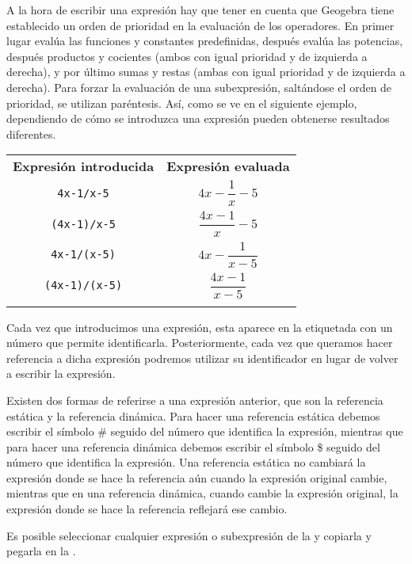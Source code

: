 A la hora de escribir una expresión hay que tener en cuenta que Geogebra tiene establecido un orden de prioridad en la evaluación de los operadores.
En primer lugar evalúa las funciones y constantes predefinidas, después evalúa las potencias, después productos y cocientes (ambos con igual prioridad y de izquierda a derecha), y por último sumas y restas (ambas con igual prioridad y de izquierda a derecha).
Para forzar la evaluación de una subexpresión, saltándose el orden de prioridad, se utilizan paréntesis.
Así, como se ve en el siguiente ejemplo, dependiendo de cómo se introduzca una expresión pueden obtenerse resultados diferentes.


\begin{center}\renewcommand{\arraystretch}{2}
\begin{tabular}{cc}
\tcrule
\textbf{Expresión introducida} & \textbf{Expresión evaluada} \\
\texttt{4x-1/x-5}              & $4x-\dfrac{1}{x}-5$         \\
\texttt{(4x-1)/x-5}            & $\dfrac{4x-1}{x}-5$         \\
\texttt{4x-1/(x-5)}            & $4x-\dfrac{1}{x-5}$         \\
\texttt{(4x-1)/(x-5)}          & $\dfrac{4x-1}{x-5}$         \\
\bcrule
\end{tabular}
\end{center}

Cada vez que introducimos una expresión, esta aparece en la  etiquetada con un número que permite identificarla.
Posteriormente, cada vez que queramos hacer referencia a dicha expresión podremos utilizar su identificador en lugar de volver a escribir la expresión.

Existen dos formas de referirse a una expresión anterior, que son la referencia estática y la referencia dinámica.
Para hacer una referencia estática debemos escribir el símbolo \# seguido del número que identifica la expresión, mientras que para hacer una referencia dinámica debemos escribir el símbolo \$ seguido del número que identifica la expresión.
Una referencia estática no cambiará la expresión donde se hace la referencia aún cuando la expresión original cambie, mientras que en una referencia dinámica, cuando cambie la expresión original, la expresión donde se hace la referencia reflejará ese cambio.

Es posible seleccionar cualquier expresión o subexpresión de la  y copiarla y pegarla en la .


